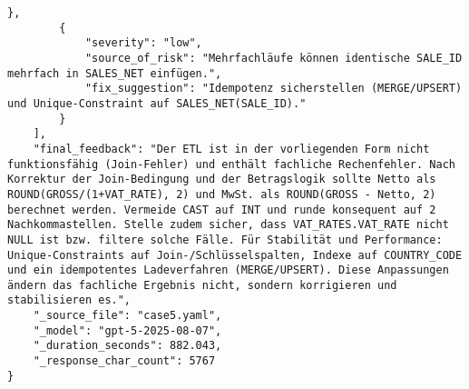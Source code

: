 \begin{lstlisting}[caption={Ausgabe: GPT-5 Anwendungsfall 5 Robustheitsdurchlauf},label={gpt_case5_prompt3}]
        },
        {
            "severity": "low",
            "source_of_risk": "Mehrfachläufe können identische SALE_ID mehrfach in SALES_NET einfügen.",
            "fix_suggestion": "Idempotenz sicherstellen (MERGE/UPSERT) und Unique-Constraint auf SALES_NET(SALE_ID)."
        }
    ],
    "final_feedback": "Der ETL ist in der vorliegenden Form nicht funktionsfähig (Join-Fehler) und enthält fachliche Rechenfehler. Nach Korrektur der Join-Bedingung und der Betragslogik sollte Netto als ROUND(GROSS/(1+VAT_RATE), 2) und MwSt. als ROUND(GROSS - Netto, 2) berechnet werden. Vermeide CAST auf INT und runde konsequent auf 2 Nachkommastellen. Stelle zudem sicher, dass VAT_RATES.VAT_RATE nicht NULL ist bzw. filtere solche Fälle. Für Stabilität und Performance: Unique-Constraints auf Join-/Schlüsselspalten, Indexe auf COUNTRY_CODE und ein idempotentes Ladeverfahren (MERGE/UPSERT). Diese Anpassungen ändern das fachliche Ergebnis nicht, sondern korrigieren und stabilisieren es.",
    "_source_file": "case5.yaml",
    "_model": "gpt-5-2025-08-07",
    "_duration_seconds": 882.043,
    "_response_char_count": 5767
}
\end{lstlisting}

